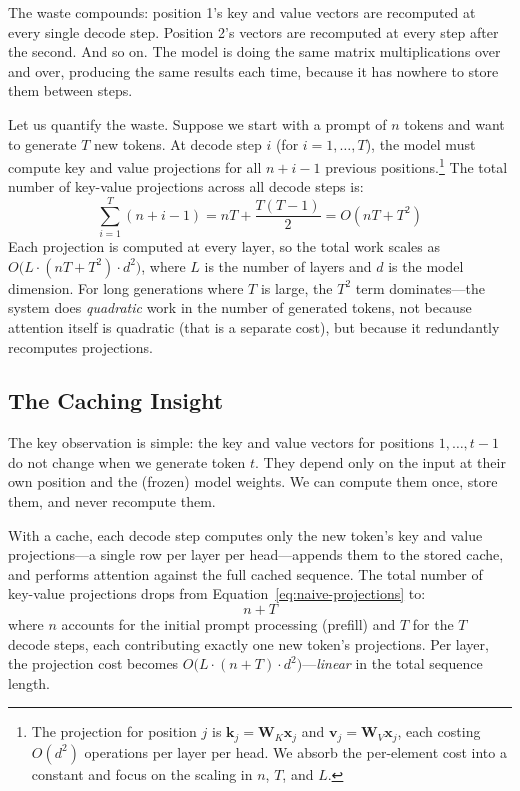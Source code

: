 The waste compounds: position 1's key and value vectors are recomputed at every single decode step. Position 2's vectors are recomputed at every step after the second. And so on. The model is doing the same matrix multiplications over and over, producing the same results each time, because it has nowhere to store them between steps.

Let us quantify the waste. Suppose we start with a prompt of $n$ tokens and want to generate $T$ new tokens. At decode step $i$ (for $i = 1, \ldots, T$), the model must compute key and value projections for all $n + i - 1$ previous positions.\footnote{The projection for position $j$ is $\mathbf{k}_j = \mathbf{W}_K \mathbf{x}_j$ and $\mathbf{v}_j = \mathbf{W}_V \mathbf{x}_j$, each costing $O(d^2)$ operations per layer per head. We absorb the per-element cost into a constant and focus on the scaling in $n$, $T$, and $L$.} The total number of key-value projections across all decode steps is:
\begin{equation}
\label{eq:naive-projections}
\sum_{i=1}^{T} (n + i - 1) = nT + \frac{T(T-1)}{2} = O(nT + T^2)
\end{equation}
Each projection is computed at every layer, so the total work scales as $O\bigl(L \cdot (nT + T^2) \cdot d^2\bigr)$, where $L$ is the number of layers and $d$ is the model dimension. For long generations where $T$ is large, the $T^2$ term dominates---the system does \emph{quadratic} work in the number of generated tokens, not because attention itself is quadratic (that is a separate cost), but because it redundantly recomputes projections.

\subsection{The Caching Insight}

%
The key observation is simple: the key and value vectors for positions $1, \ldots, t-1$ do not change when we generate token $t$. They depend only on the input at their own position and the (frozen) model weights. We can compute them once, store them, and never recompute them.

With a cache, each decode step computes only the new token's key and value projections---a single row per layer per head---appends them to the stored cache, and performs attention against the full cached sequence. The total number of key-value projections drops from Equation~\ref{eq:naive-projections} to:
\begin{equation}
\label{eq:cached-projections}
n + T
\end{equation}
where $n$ accounts for the initial prompt processing (prefill) and $T$ for the $T$ decode steps, each contributing exactly one new token's projections. Per layer, the projection cost becomes $O\bigl(L \cdot (n + T) \cdot d^2\bigr)$---\emph{linear} in the total sequence length.

